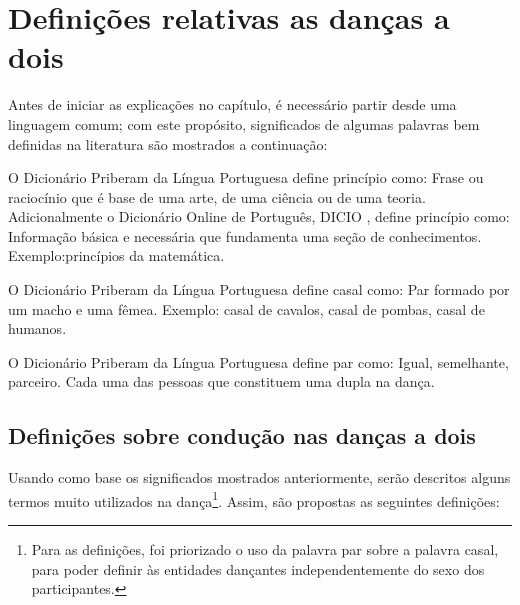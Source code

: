 
\section{Definições relativas as danças a dois}

Antes de iniciar as explicações no capítulo, 
é necessário partir desde uma linguagem comum;
com este propósito, 
significados de algumas palavras bem definidas na literatura são mostrados a continuação:
 
\begin{definition}[Princípio:] 
\label{def:Principio}O Dicionário Priberam da Língua Portuguesa \cite{priberamprincipio} define princípio como:
Frase ou raciocínio que é base de uma arte, de uma ciência ou de uma teoria.
Adicionalmente o Dicionário Online de Português, DICIO \cite{dicioprincipio}, define princípio como:
Informação básica e necessária que fundamenta uma seção de conhecimentos.
Exemplo:princípios da matemática.
\end{definition}

\begin{definition}[Casal:] 
\label{def:Casal} O Dicionário Priberam da Língua Portuguesa \cite{priberamcasal} define casal como:
Par formado por um macho e uma fêmea.
Exemplo: casal de cavalos, casal de pombas, casal de humanos.
\end{definition}

\begin{definition}[Par:] 
\label{def:Par} O Dicionário Priberam da Língua Portuguesa \cite{priberampar} define par como:
Igual, semelhante, parceiro.
Cada uma das pessoas que constituem uma dupla na dança.
\end{definition}


\subsection{Definições sobre condução nas danças a dois}
Usando como base os significados mostrados anteriormente, 
serão descritos alguns termos muito utilizados na dança\footnote{
Para as definições, foi priorizado o uso da palavra par sobre a palavra casal,
para poder definir às entidades dançantes independentemente do sexo dos participantes.}.
Assim,  são propostas as seguintes definições:

